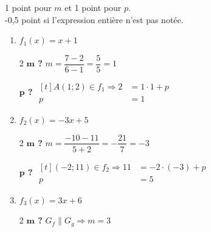 %
%
    1 point pour $m$ et 1 point pour $p$.\\
    -0,5 point si l'expression entière n'est pas notée.
    \raggedcolumns
    \begin{enumerate}
        \item $f_1(x) = x+1$

              \begin{multicols}{2}
                  \textbf{$\bm{m}$ ?}
                  \medbreak
                  $m=\dfrac{7-2}{6-1}=\dfrac{5}{5}=1$

                  \textbf{$\bm{p}$ ?}
                  \medbreak
                  $\begin{aligned}[t]
                          A(1;2)\in f_1 \Rightarrow 2 & = 1\cdot 1 + p \\
                          p                           & = 1
                      \end{aligned}$
              \end{multicols}
        \item $f_2(x) = -3x+5$
              \begin{multicols}{2}
                  \textbf{$\bm{m}$ ?}
                  \medbreak
                  $m=\dfrac{-10-11}{5+2}=-\dfrac{21}{7}=-3$

                  \textbf{$\bm{p}$ ?}
                  \medbreak
                  $\begin{aligned}[t]
                          (-2;11)\in f_2 \Rightarrow 11 & = -2\cdot (-3) + p \\
                          p                             & = 5
                      \end{aligned}$
              \end{multicols}
        \item $f_3(x) = 3x + 6$
              \begin{multicols}{2}
                  \textbf{$\bm{m}$ ?}
                  \medbreak
                  $G_f \parallel G_g \Rightarrow m = 3$
                  \columnbreak


\end{multicols}
\end{enumerate}
